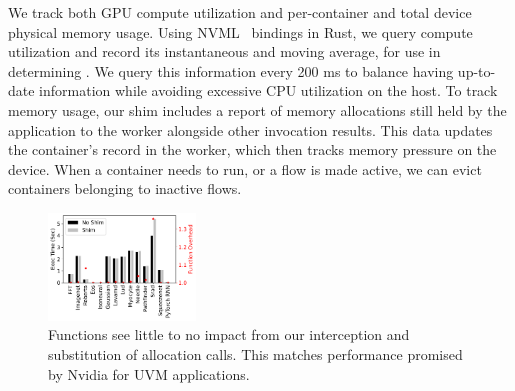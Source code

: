 

We track both GPU compute utilization and per-container and total device physical memory usage.
Using NVML~\cite{nvml} bindings in Rust, we query compute utilization and record its instantaneous and moving average, for use in determining \D.
We query this information every 200 ms to balance having up-to-date information while avoiding excessive CPU utilization on the host.
To track memory usage, our shim includes a report of memory allocations still held by the application to the worker alongside other invocation results. 
This data updates the container's record in the worker, which then tracks memory pressure on the device.
When a container needs to run, or a flow is made active, we can evict containers belonging to inactive flows. 


\begin{figure}
  \includegraphics[width=0.35\textwidth]{../graphs/driver-compare/8-exec_time.pdf}
  \vspace*{\captionspace}
  \caption{Functions see little to no impact from our interception and substitution of allocation calls.
          This matches performance promised by Nvidia for UVM applications.}
          \vspace{-0.3cm}
          \label{fig:shim-overhead}
\end{figure}


